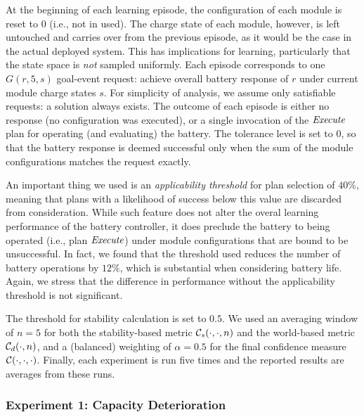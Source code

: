 At the beginning of each learning episode, the configuration of each module is reset to $0$ (i.e., not in used). 
The charge state of each module, however, is left untouched and carries over from the previous episode, as it would be the case in the actual deployed system. This has implications for learning, particularly that the state space is \emph{not} sampled uniformly. %
Each episode corresponds to one $G(r,5,s)$ goal-event request: achieve overall battery response of $r$ under current module charge states $s$.  For simplicity of analysis, we assume only satisfiable requests: a solution always exists. The outcome of each episode is either no response (no configuration was executed), or a single invocation of the $\operatorname{\textit{Execute}}$ plan for operating (and evaluating) the battery.  The tolerance level is set to $0$, so that the battery response is deemed successful only when the sum of the module configurations matches the request exactly.

An important thing we used is an \emph{applicability threshold} for plan selection of $40\%$, meaning that plans with a likelihood of success below this value are discarded from consideration. While such feature does not alter the overal learning performance of the battery controller, it does preclude the battery to being operated (i.e., plan $\operatorname{\textit{Execute}}$) under module configurations that are bound to be unsuccessful. In fact, we found that the threshold used reduces the number of battery operations by $12\%$, which is substantial when considering battery life. Again, we stress that the difference in performance without the applicability threshold is not significant.


The threshold for stability calculation is set to $0.5$. We used an averaging window of $n=5$ for both the stability-based metric ${\mathcal{C}}_s(\cdot,\cdot,n)$ and the world-based metric ${\mathcal{C}}_d(\cdot,n)$, and a (balanced) weighting of $\alpha=0.5$ for the final confidence measure ${\mathcal{C}}(\cdot,\cdot,\cdot)$.
Finally, each experiment is run five times and the reported results are averages from these runs.



\subsubsection{Experiment 1: Capacity Deterioration}

